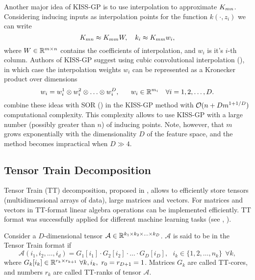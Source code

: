   Another major idea of KISS-GP is to use interpolation to approximate $K_{mn}$.
  Considering inducing inputs as interpolation points for the function
  $k(\cdot, z_i)$ we can write
  \begin{equation}
  \label{kernel_interpolation}
    K_{mn} \approx K_{mm} W,~~~k_{i} \approx K_{mm} w_i,
  \end{equation}
  where $W \in \mathbb{R}^{m \times n}$ contains the coefficients of interpolation, and
  $w_i$ is it's $i$-th column. Authors of KISS-GP suggest using cubic
  convolutional interpolation (\citet{keys1981}), in which case the interpolation
  weights $w_i$ can be represented as a Kronecker product over dimensions
  \[
    w_i = w_i^1 \otimes w_i^2 \otimes \ldots \otimes w_i^D,~~~~~w_i \in \mathbb{R}^{m_i}~~~\forall i = 1, 2, \ldots, D.
  \]
  \citet{wilson2015} combine these ideas with SOR (\citet{silverman1985})
  in the KISS-GP method with $\mathcal{O}(n + D m^{1 + 1/D})$ computational
  complexity. This complexity allows to use KISS-GP with a large number (possibly
  greater than $n$) of inducing points. Note, however, that $m$ grows
  exponentially with the dimensionality $D$ of the feature space, and the
  method becomes impractical when $D \gg 4$.

\subsection{Tensor Train Decomposition}
\label{tensor_train}

  Tensor Train (TT) decomposition, proposed in \citet{oseledets2011}, allows to
  efficiently store tensors (multidimensional arrays of data), large matrices and
  vectors. For matrices and vectors in TT-format linear algebra operations
  can be implemented efficiently. TT format was successfully applied for
  different machine learning tasks (see \citet{novikov2014}, \citet{novikov2015}).

  Consider a $D$-dimensional tensor $\mathcal A \in \mathbb{R}^{k_1 \times k_2 \times \ldots \times k_D}$.
  $\mathcal{A}$ is said to be in the Tensor Train format if
  \begin{equation}
  \label{tt}
    \mathcal{A}(i_1, i_2, \ldots, i_d) = G_1[i_1] \cdot G_2[i_2] \cdot \ldots \cdot G_D[i_D],~~~
    i_k \in \{1, 2, \ldots, n_k\}~~\forall k,
  \end{equation}
  where $G_k[i_k] \in \R^{r_k\times r_{k+1}}\ \forall k, i_k,\ r_0 = r_{D+1} = 1$. Matrices $G_k$ are called TT-cores, and numbers $r_k$ are called TT-ranks of
  tensor $\mathcal{A}$.

